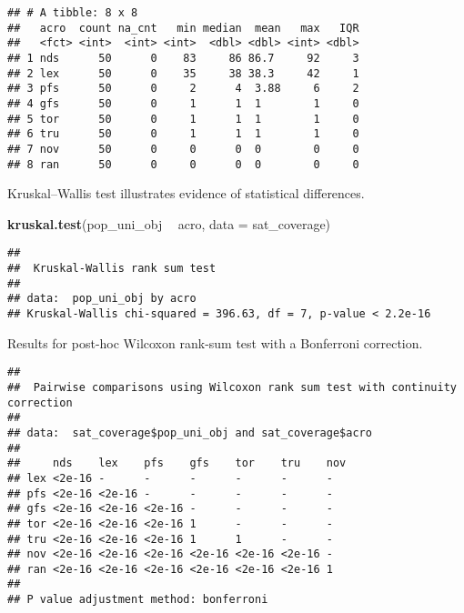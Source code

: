 \documentclass[]{book}
\newenvironment{Shaded}{\begin{snugshade}}{\end{snugshade}}
\newcommand{\DataTypeTok}[1]{\textcolor[rgb]{0.13,0.29,0.53}{#1}}
\newcommand{\KeywordTok}[1]{\textcolor[rgb]{0.13,0.29,0.53}{\textbf{#1}}}
\newcommand{\NormalTok}[1]{#1}
\newcommand{\OperatorTok}[1]{\textcolor[rgb]{0.81,0.36,0.00}{\textbf{#1}}}
\newcommand{\OtherTok}[1]{\textcolor[rgb]{0.56,0.35,0.01}{#1}}
\newcommand{\StringTok}[1]{\textcolor[rgb]{0.31,0.60,0.02}{#1}}
\begin{document}
\begin{verbatim}
## # A tibble: 8 x 8
##   acro  count na_cnt   min median  mean   max   IQR
##   <fct> <int>  <int> <int>  <dbl> <dbl> <int> <dbl>
## 1 nds      50      0    83     86 86.7     92     3
## 2 lex      50      0    35     38 38.3     42     1
## 3 pfs      50      0     2      4  3.88     6     2
## 4 gfs      50      0     1      1  1        1     0
## 5 tor      50      0     1      1  1        1     0
## 6 tru      50      0     1      1  1        1     0
## 7 nov      50      0     0      0  0        0     0
## 8 ran      50      0     0      0  0        0     0
\end{verbatim}

Kruskal--Wallis test illustrates evidence of statistical differences.

\begin{Shaded}
\begin{Highlighting}[]
\KeywordTok{kruskal.test}\NormalTok{(pop_uni_obj }\OperatorTok{~}\StringTok{ }\NormalTok{acro, }\DataTypeTok{data =}\NormalTok{ sat_coverage)}
\end{Highlighting}
\end{Shaded}

\begin{verbatim}
## 
##  Kruskal-Wallis rank sum test
## 
## data:  pop_uni_obj by acro
## Kruskal-Wallis chi-squared = 396.63, df = 7, p-value < 2.2e-16
\end{verbatim}

Results for post-hoc Wilcoxon rank-sum test with a Bonferroni correction.

\begin{Shaded}
\end{Shaded}

\begin{verbatim}
## 
##  Pairwise comparisons using Wilcoxon rank sum test with continuity correction 
## 
## data:  sat_coverage$pop_uni_obj and sat_coverage$acro 
## 
##     nds    lex    pfs    gfs    tor    tru    nov
## lex <2e-16 -      -      -      -      -      -  
## pfs <2e-16 <2e-16 -      -      -      -      -  
## gfs <2e-16 <2e-16 <2e-16 -      -      -      -  
## tor <2e-16 <2e-16 <2e-16 1      -      -      -  
## tru <2e-16 <2e-16 <2e-16 1      1      -      -  
## nov <2e-16 <2e-16 <2e-16 <2e-16 <2e-16 <2e-16 -  
## ran <2e-16 <2e-16 <2e-16 <2e-16 <2e-16 <2e-16 1  
## 
## P value adjustment method: bonferroni
\end{verbatim}
\end{document}
